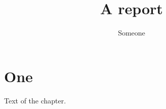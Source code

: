\documentclass[11pt]{report}
\title{A report}
\author{Someone}
\date{}
\begin{document}
\maketitle
\listoffigures
\listoftables
\chapter{One}
Text of the chapter.
\end{document}
